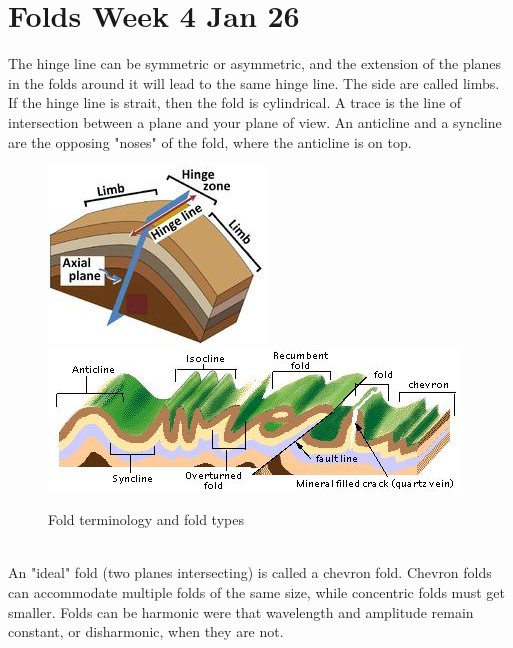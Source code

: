 \documentclass[12pt,a4paper]{report}
\begin{document}


\section*{Folds Week 4 Jan 26}
The hinge line can be symmetric or asymmetric, and the extension of the planes in the folds around it will lead to the same hinge line.
The side are called limbs. If the hinge line is strait, then the fold is cylindrical.
A trace is the line of intersection between a plane and your plane of view.
An anticline and a syncline are the opposing "noses" of the fold, where the anticline is on top.
\begin{figure}[h]
  \includegraphics[scale=0.60]{folds-terminology.jpg}
  \includegraphics[scale=0.80]{fold-types.jpg}
  \centering
  \caption{Fold terminology and fold types}
\end{figure}\\
An "ideal" fold (two planes intersecting) is called a chevron fold.
Chevron folds can accommodate multiple folds of the same size, while concentric folds must get smaller.
Folds can be harmonic were that wavelength and amplitude remain constant, or disharmonic, when they are not.
\end{document}
